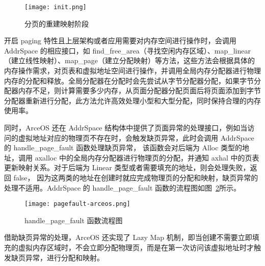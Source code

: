 \begin{figure}[H]
    \centering
    \texttt{[image: init.png]}
    \caption{分页的重建映射阶段}
    \label{fig:init}
\end{figure}

开启 paging 特性且上层架构或者应用需要对内存空间进行操作时，会调用 AddrSpace 的相应接口，如 find\_free\_area（寻找空闲内存区域）、map\_linear（建立线性映射）、map\_page（建立分配映射）等方法，这些方法会根据具体的内存操作需求，对页表和虚拟地址空间进行操作，并调用全局内存分配器进行物理内存的分配和释放。全局分配器在分配时会先尝试从字节分配器分配，如果字节分配器内存不足，则计算需要多少内存，从页面分配器分配页面后将页面添加到字节分配器重新进行分配，此方法允许高效处理小型和大型分配，同时保持合理的内存使用率。

同时，ArceOS 还在 AddrSpace 结构体中提供了页面异常的处理接口，例如当访问的虚拟地址对应的物理页不存在时，会触发缺页异常，此时会调用 AddrSpace 的 handle\_page\_fault 函数处理缺页异常，
该函数会对后端为 Alloc 类型的地址，调用 axalloc 中的全局内存分配器进行物理页的分配，并通知 axhal 中的页表更新映射关系。对于后端为 Linear 类型或者需要填充的地址，则会处理失败，返回 false，
因为这两类的地址在创建时就应完成物理页的分配和映射，缺页异常的处理不适用。AddrSpace 的 handle\_page\_fault 函数的流程图如图~\ref{fig:handle-page-fault-arceos}所示。

\begin{figure}
    \centering
    \texttt{[image: pagefault-arceos.png]}
    \caption{handle\_page\_fault 函数流程图}
    \label{fig:handle-page-fault-arceos}
\end{figure}


借助缺页异常的处理，ArceOS 还实现了 Lazy Map 机制，即当创建不需要立即填充的虚拟内存区域时，不会立即分配物理页，而是在第一次访问该虚拟地址时才触发缺页异常，进行分配和映射。